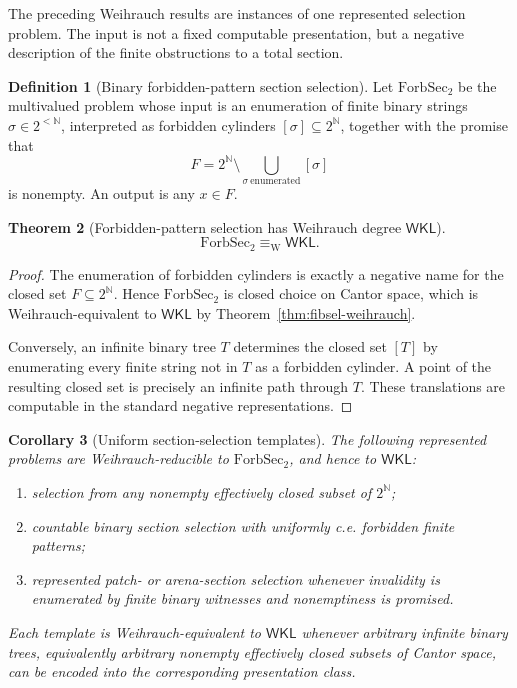 \documentclass[11pt]{article}
\theoremstyle{plain}
\newtheorem{theorem}{Theorem}[section]
\newtheorem{corollary}[theorem]{Corollary}
\theoremstyle{definition}
\newtheorem{definition}[theorem]{Definition}
\theoremstyle{remark}
\newcommand{\N}{\mathbb{N}}
\begin{document}
The preceding Weihrauch results are instances of one represented selection
problem. The input is not a fixed computable presentation, but a negative
description of the finite obstructions to a total section.

\begin{definition}[Binary forbidden-pattern section selection]
\label{def:forbidden-section-selection}
Let $\mathrm{ForbSec}_2$ be the multivalued problem whose input is an enumeration
of finite binary strings $\sigma\in2^{<\N}$, interpreted as forbidden cylinders
$[\sigma]\subseteq2^\N$, together with the promise that
\[
F=2^\N\setminus\bigcup_{\sigma\ \mathrm{enumerated}}[\sigma]
\]
is nonempty. An output is any $x\in F$.
\end{definition}

\begin{theorem}[Forbidden-pattern selection has Weihrauch degree $\mathsf{WKL}$]
\label{thm:forbidden-section-WKL}
\[
\mathrm{ForbSec}_2\equiv_{\mathrm W}\mathsf{WKL}.
\]
\end{theorem}

\begin{proof}
The enumeration of forbidden cylinders is exactly a negative name for the closed
set $F\subseteq2^\N$. Hence $\mathrm{ForbSec}_2$ is closed choice on Cantor space,
which is Weihrauch-equivalent to $\mathsf{WKL}$ by
Theorem~\ref{thm:fibsel-weihrauch}.

Conversely, an infinite binary tree $T$ determines the closed set $[T]$ by
enumerating every finite string not in $T$ as a forbidden cylinder. A point of the
resulting closed set is precisely an infinite path through $T$. These
translations are computable in the standard negative representations.
\end{proof}

\begin{corollary}[Uniform section-selection templates]
\label{cor:section-selection-templates}
The following represented problems are Weihrauch-reducible to
$\mathrm{ForbSec}_2$, and hence to $\mathsf{WKL}$:
\begin{enumerate}[label=(\roman*)]
\item selection from any nonempty effectively closed subset of $2^\N$;
\item countable binary section selection with uniformly c.e. forbidden finite
patterns;
\item represented patch- or arena-section selection whenever invalidity is
enumerated by finite binary witnesses and nonemptiness is promised.
\end{enumerate}
Each template is Weihrauch-equivalent to $\mathsf{WKL}$ whenever arbitrary
infinite binary trees, equivalently arbitrary nonempty effectively closed subsets
of Cantor space, can be encoded into the corresponding presentation class.
\end{corollary}
\end{document}
